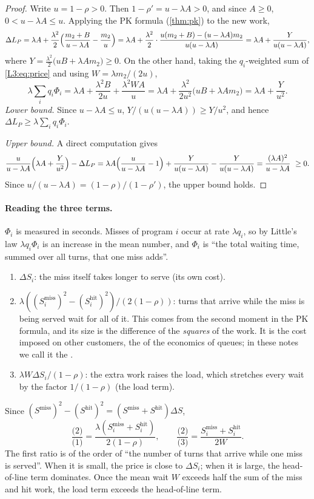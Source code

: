 \begin{proof}
Write $u=1-\rho>0$. Then $1-\rho'=u-\lambda A>0$, and since $A\ge0$,
$0<u-\lambda A\le u$. Applying the PK formula (\cref{thm:pk}) to the new work,
\[
  \Delta L_P=\lambda A+\frac{\lambda^2}{2}\Bigl(\frac{m_2+B}{u-\lambda A}-\frac{m_2}{u}\Bigr)
  =\lambda A+\frac{\lambda^2}{2}\cdot\frac{u(m_2+B)-(u-\lambda A)m_2}{u(u-\lambda A)}
  =\lambda A+\frac{Y}{u(u-\lambda A)},
\]
where $Y=\frac{\lambda^2}{2}\bigl(uB+\lambda A m_2\bigr)\ge0$. On the other hand,
taking the $q_i$-weighted sum of \cref{L3:eq:price} and using $W=\lambda m_2/(2u)$,
\[
  \lambda\sum_iq_i\Phi_i=\lambda A+\frac{\lambda^2B}{2u}+\frac{\lambda^2WA}{u}
  =\lambda A+\frac{\lambda^2}{2u^2}\bigl(uB+\lambda Am_2\bigr)
  =\lambda A+\frac{Y}{u^2}.
\]
\emph{Lower bound.} Since $u-\lambda A\le u$, $Y/(u(u-\lambda A))\ge Y/u^2$, and
hence $\Delta L_P\ge\lambda\sum_iq_i\Phi_i$.

\emph{Upper bound.} A direct computation gives
\[
  \frac{u}{u-\lambda A}\Bigl(\lambda A+\frac{Y}{u^2}\Bigr)-\Delta L_P
  =\lambda A\Bigl(\frac{u}{u-\lambda A}-1\Bigr)+\frac{Y}{u(u-\lambda A)}-\frac{Y}{u(u-\lambda A)}
  =\frac{(\lambda A)^2}{u-\lambda A}\ \ge0 .
\]
Since $u/(u-\lambda A)=(1-\rho)/(1-\rho')$, the upper bound holds.
\end{proof}

\paragraph{Reading the three terms.} $\Phi_i$ is measured in seconds. Misses of
program $i$ occur at rate $\lambda q_i$, so by Little's law $\lambda q_i\Phi_i$ is
an increase in the mean number, and $\Phi_i$ is ``the total waiting time, summed
over all turns, that one miss adds''.
\begin{enumerate}[label=(\arabic*)]
\item $\Delta S_i$: the miss itself takes longer to serve (its own cost).
\item $\lambda((S^{\mathrm{miss}}_i)^2-(S^{\mathrm{hit}}_i)^2)/(2(1-\rho))$: turns
  that arrive while the miss is being served wait for all of it. This comes from
  the second moment in the PK formula, and its size is the difference of the
  \emph{squares} of the work. It is the cost imposed on other customers, the
   of the economics of queues; in these notes we call it the
  .
\item $\lambda W\Delta S_i/(1-\rho)$: the extra work raises the load, which
  stretches every wait by the factor $1/(1-\rho)$ (the load term).
\end{enumerate}
Since $(S^{\mathrm{miss}})^2-(S^{\mathrm{hit}})^2=(S^{\mathrm{miss}}+S^{\mathrm{hit}})\Delta S$,
\[
  \frac{\text{(2)}}{\text{(1)}}=\frac{\lambda(S_i^{\mathrm{miss}}+S_i^{\mathrm{hit}})}{2(1-\rho)},\qquad
  \frac{\text{(2)}}{\text{(3)}}=\frac{S_i^{\mathrm{miss}}+S_i^{\mathrm{hit}}}{2W}.
\]
The first ratio is of the order of ``the number of turns that arrive while one
miss is served''. When it is small, the price is close to $\Delta S_i$; when it is
large, the head-of-line term dominates. Once the mean wait $W$ exceeds half the
sum of the miss and hit work, the load term exceeds the head-of-line term.

